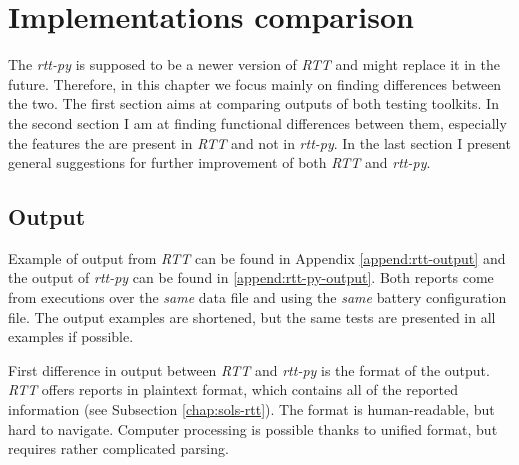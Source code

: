 \documentclass[
  digital,     %
  oneside,     %
  nosansbold,  %
  nocolorbold, %
  nolof,         %
  nolot,         %
]{fithesis4}
\begin{document}





\chapter{Implementations comparison} \label{chap:comparison}



The \emph{rtt-py} is supposed to be a newer version of \emph{RTT} and might replace it in the future. Therefore, in this chapter we focus mainly on finding differences between the two. The first section aims at comparing outputs of both testing toolkits. In the second section I am at finding functional differences between them, especially the features the are present in \emph{RTT} and not in \emph{rtt-py}. In the last section I present general suggestions for further improvement of both \emph{RTT} and \emph{rtt-py}. 

\section{Output}
Example of output from \emph{RTT} can be found in Appendix \ref{append:rtt-output} and the output of \emph{rtt-py} can be found in \ref{append:rtt-py-output}. Both reports come from executions over the \emph{same} data file and using the \emph{same} battery configuration file. The output examples are shortened, but the same tests are presented in all examples if possible.

First difference in output between \emph{RTT} and \emph{rtt-py} is the format of the output. \emph{RTT} offers reports in plaintext format, which contains all of the reported information (see Subsection \ref{chap:sols-rtt}). The format is human-readable, but hard to navigate. Computer processing is possible thanks to unified format, but requires rather complicated parsing.
\end{document}
